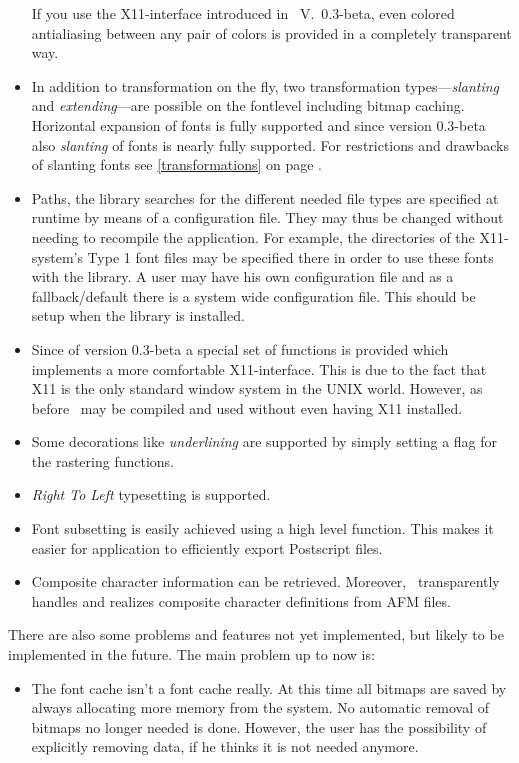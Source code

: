 \begin{itemize}
  If you use the X11-interface introduced in \tonelib\ V.\ 0.3-beta, 
  even colored antialiasing between any pair of colors is provided in a
  completely transparent way.
\item In addition to transformation on the fly, two transformation
  types---{\em slanting} and {\em extending}---are possible on the fontlevel
  including bitmap caching. Horizontal expansion of fonts is fully supported
  and since version 0.3-beta also {\em slanting} of fonts is nearly fully
  supported.  For restrictions and drawbacks of slanting fonts see
  \ref{transformations} on page \pageref{transformations}.
\item Paths, the library searches for the different needed file types
  are specified at runtime by means of a
  configuration file. They may thus be changed without needing to
  recompile the application. For example, the directories of the
  X11-system's Type 1 font files may be specified there in order to use
  these fonts with the library. A user may have his own configuration file and
  as a fallback/default there is a system wide configuration file. This should
  be setup when the library is installed.
\item Since of version 0.3-beta a special set of functions is provided which
  implements a more comfortable X11-interface. This is due to the fact that
  X11 is the only standard window system in the UNIX world. However, as before
  \tonelib\ may be compiled and used without even having X11 installed.
\item Some decorations like {\em underlining} are supported by simply setting
  a flag for the rastering functions.
\item {\em Right To Left} typesetting is supported.
\item Font subsetting is easily achieved using a high level function. This
  makes it easier for application to efficiently export Postscript files.
\item Composite character information can be retrieved. Moreover, \tonelib\
  transparently handles and realizes composite character definitions from AFM
  files.
\end{itemize}
There are also some problems and features not yet
implemented, but likely to be implemented in the future.
The main problem up to now is:
\begin{itemize}
\item The font cache isn't a font cache really. At this time all
  bitmaps are saved by always allocating more memory from the
  system. No automatic removal of bitmaps no longer needed is 
  done. However, the user has the possibility of explicitly
  removing data, if he thinks it is not needed anymore.
\end{itemize}

